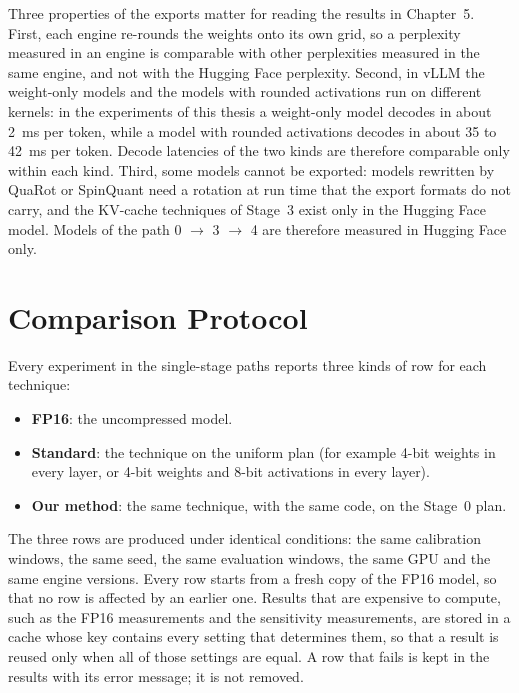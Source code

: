 Three properties of the exports matter for reading the results in Chapter~5. First, each engine re-rounds the weights onto its own grid, so a perplexity measured in an engine is comparable with other perplexities measured in the same engine, and not with the Hugging Face perplexity. Second, in vLLM the weight-only models and the models with rounded activations run on different kernels: in the experiments of this thesis a weight-only model decodes in about 2~ms per token, while a model with rounded activations decodes in about 35 to 42~ms per token. Decode latencies of the two kinds are therefore comparable only within each kind. Third, some models cannot be exported: models rewritten by QuaRot or SpinQuant need a rotation at run time that the export formats do not carry, and the KV-cache techniques of Stage~3 exist only in the Hugging Face model. Models of the path 0 $\rightarrow$ 3 $\rightarrow$ 4 are therefore measured in Hugging Face only.

\section{Comparison Protocol}
\label{sec:ch4-protocol}

Every experiment in the single-stage paths reports three kinds of row for each technique:

\begin{itemize}
  \item \textbf{FP16}: the uncompressed model.
  \item \textbf{Standard}: the technique on the uniform plan (for example 4-bit weights in every layer, or 4-bit weights and 8-bit activations in every layer).
  \item \textbf{Our method}: the same technique, with the same code, on the Stage~0 plan.
\end{itemize}

The three rows are produced under identical conditions: the same calibration windows, the same seed, the same evaluation windows, the same GPU and the same engine versions. Every row starts from a fresh copy of the FP16 model, so that no row is affected by an earlier one. Results that are expensive to compute, such as the FP16 measurements and the sensitivity measurements, are stored in a cache whose key contains every setting that determines them, so that a result is reused only when all of those settings are equal. A row that fails is kept in the results with its error message; it is not removed.


